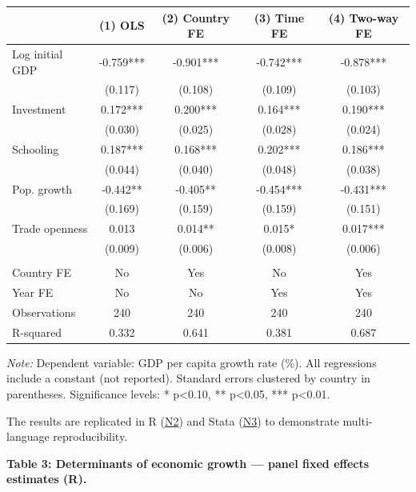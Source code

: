 \documentclass[
  letterpaper,
  DIV=11,
  numbers=noendperiod]{scrartcl}
\newcounter{none} %
\begin{document}
{\def\LTcaptype{none} %
\begin{longtable}[]{@{}lcccc@{}}
\toprule\noalign{}
& (1) OLS & (2) Country FE & (3) Time FE & (4) Two-way FE \\
\midrule\noalign{}
\endhead
\bottomrule\noalign{}
\endlastfoot
Log initial GDP & -0.759*** & -0.901*** & -0.742*** & -0.878*** \\
& (0.117) & (0.108) & (0.109) & (0.103) \\
Investment & 0.172*** & 0.200*** & 0.164*** & 0.190*** \\
& (0.030) & (0.025) & (0.028) & (0.024) \\
Schooling & 0.187*** & 0.168*** & 0.202*** & 0.186*** \\
& (0.044) & (0.040) & (0.048) & (0.038) \\
Pop. growth & -0.442** & -0.405** & -0.454*** & -0.431*** \\
& (0.169) & (0.159) & (0.159) & (0.151) \\
Trade openness & 0.013 & 0.014** & 0.015* & 0.017*** \\
& (0.009) & (0.006) & (0.008) & (0.006) \\
& & & & \\
Country FE & No & Yes & No & Yes \\
Year FE & No & No & Yes & Yes \\
Observations & 240 & 240 & 240 & 240 \\
R-squared & 0.332 & 0.641 & 0.381 & 0.687 \\
\end{longtable}
}

\emph{Note:} Dependent variable: GDP per capita growth rate (\%). All
regressions include a constant (not reported). Standard errors clustered
by country in parentheses. Significance levels: * p\textless0.10, **
p\textless0.05, *** p\textless0.01.

The results are replicated in R (\href{notebooks/notebook-02.qmd}{N2})
and Stata (\href{notebooks/notebook-03.qmd}{N3}) to demonstrate
multi-language reproducibility.

\textbf{Table 3: Determinants of economic growth --- panel fixed effects
estimates (R).}
\end{document}
